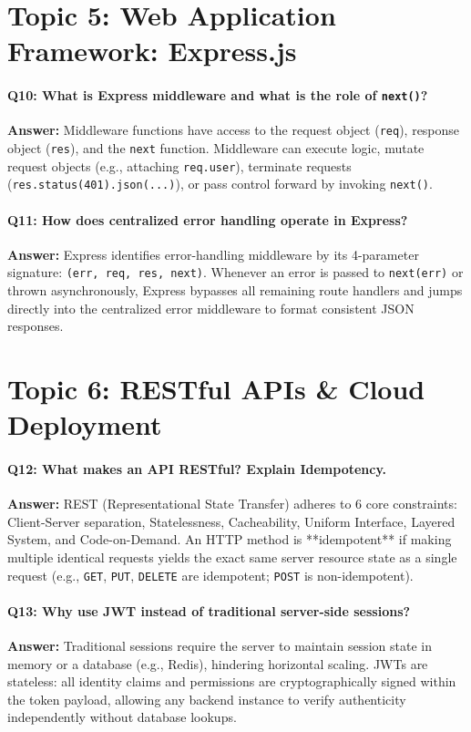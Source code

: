 \documentclass[12pt,a4paper,oneside]{report}
\begin{document}
\section{Topic 5: Web Application Framework: Express.js}
\paragraph{Q10: What is Express middleware and what is the role of \texttt{next()}?}
\textbf{Answer:} Middleware functions have access to the request object (\texttt{req}), response object (\texttt{res}), and the \texttt{next} function. Middleware can execute logic, mutate request objects (e.g., attaching \texttt{req.user}), terminate requests (\texttt{res.status(401).json(...)}), or pass control forward by invoking \texttt{next()}.

\paragraph{Q11: How does centralized error handling operate in Express?}
\textbf{Answer:} Express identifies error-handling middleware by its 4-parameter signature: \texttt{(err, req, res, next)}. Whenever an error is passed to \texttt{next(err)} or thrown asynchronously, Express bypasses all remaining route handlers and jumps directly into the centralized error middleware to format consistent JSON responses.

\section{Topic 6: RESTful APIs \& Cloud Deployment}
\paragraph{Q12: What makes an API RESTful? Explain Idempotency.}
\textbf{Answer:} REST (Representational State Transfer) adheres to 6 core constraints: Client-Server separation, Statelessness, Cacheability, Uniform Interface, Layered System, and Code-on-Demand. An HTTP method is **idempotent** if making multiple identical requests yields the exact same server resource state as a single request (e.g., \texttt{GET}, \texttt{PUT}, \texttt{DELETE} are idempotent; \texttt{POST} is non-idempotent).

\paragraph{Q13: Why use JWT instead of traditional server-side sessions?}
\textbf{Answer:} Traditional sessions require the server to maintain session state in memory or a database (e.g., Redis), hindering horizontal scaling. JWTs are stateless: all identity claims and permissions are cryptographically signed within the token payload, allowing any backend instance to verify authenticity independently without database lookups.
\end{document}
